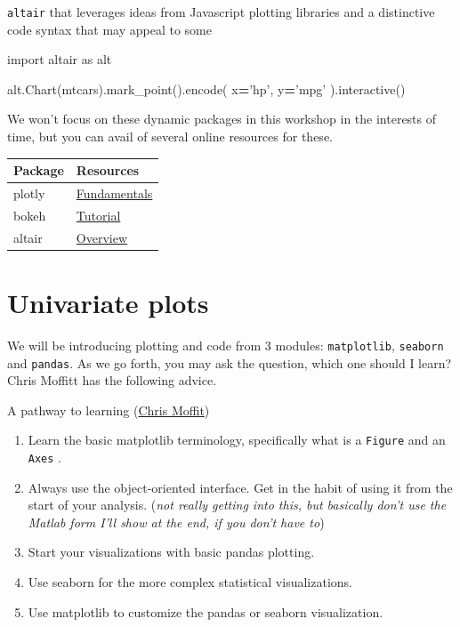 \documentclass[
  letterpaper,
]{scrbook}
\newenvironment{Shaded}{\begin{snugshade}}{\end{snugshade}}
\newcommand{\ImportTok}[1]{#1}
\newcommand{\NormalTok}[1]{#1}
\newcommand{\OperatorTok}[1]{\textcolor[rgb]{0.81,0.36,0.00}{\textbf{#1}}}
\newcommand{\StringTok}[1]{\textcolor[rgb]{0.31,0.60,0.02}{#1}}
\providecommand{\tightlist}{%
  \setlength{\itemsep}{0pt}\setlength{\parskip}{0pt}}
\begin{document}
\texttt{altair} that leverages ideas from Javascript plotting libraries and a distinctive code syntax that may appeal to some

\begin{Shaded}
\begin{Highlighting}[]
\ImportTok{import}\NormalTok{ altair }\ImportTok{as}\NormalTok{ alt}

\NormalTok{alt.Chart(mtcars).mark_point().encode(}
\NormalTok{    x}\OperatorTok{=}\StringTok{'hp'}\NormalTok{,}
\NormalTok{    y}\OperatorTok{=}\StringTok{'mpg'}
\NormalTok{).interactive()}
\end{Highlighting}
\end{Shaded}

We won't focus on these dynamic packages in this workshop in the interests of time, but you can avail of several online resources for these.

\begin{longtable}[]{@{}ll@{}}
\toprule
Package & Resources\tabularnewline
\midrule
\endhead
plotly & \href{https://plotly.com/python/}{Fundamentals}\tabularnewline
bokeh & \href{https://mybinder.org/v2/gh/bokeh/bokeh-notebooks/master?filepath=tutorial\%2F00\%20-\%20Introduction\%20and\%20Setup.ipynb}{Tutorial}\tabularnewline
altair & \href{https://altair-viz.github.io/getting_started/overview.html}{Overview}\tabularnewline
\bottomrule
\end{longtable}

\hypertarget{univariate-plots}{%
\section{Univariate plots}\label{univariate-plots}}

We will be introducing plotting and code from 3 modules: \texttt{matplotlib}, \texttt{seaborn} and \texttt{pandas}. As we go forth, you may ask the question, which one should I learn? Chris Moffitt has the following advice.

A pathway to learning (\href{https://pbpython.com/effective-matplotlib.html}{Chris Moffit})

\begin{enumerate}
\def\labelenumi{\arabic{enumi}.}
\tightlist
\item
  Learn the basic matplotlib terminology, specifically what is a \texttt{Figure} and an \texttt{Axes} .
\item
  Always use the object-oriented interface. Get in the habit of using it from the start of your analysis. (\emph{not really getting into this, but basically don't use the Matlab form I'll show at the end, if you don't have to})
\item
  Start your visualizations with basic pandas plotting.
\item
  Use seaborn for the more complex statistical visualizations.
\item
  Use matplotlib to customize the pandas or seaborn visualization.
\end{enumerate}
\end{document}
